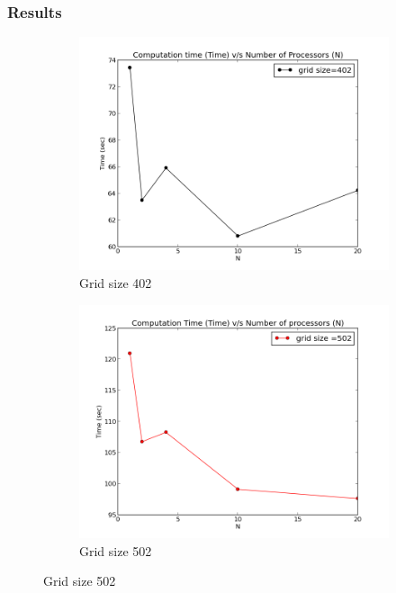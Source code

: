 \documentclass{beamer}
\begin{document}
\begin{frame}
\frametitle{Results}
\begin{figure}
\centering 
\begin{subfigure}{0.49\textwidth}
\includegraphics[width=\textwidth]{402}
\caption{Grid size 402}
\end{subfigure}
\begin{subfigure}{0.49\textwidth}
\includegraphics[width=\textwidth]{502}
\caption{Grid size 502}
\end{subfigure}
\end{figure}
\end{frame}

\end{document}
